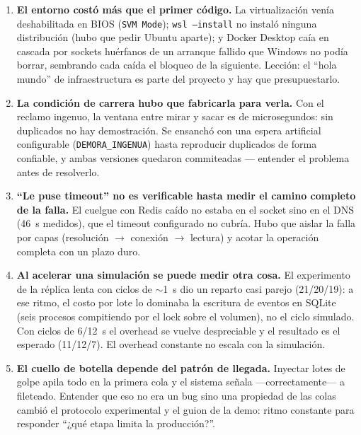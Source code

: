 \documentclass[12pt,a4paper]{article}
\begin{document}
\begin{enumerate}[leftmargin=*]
  \item \textbf{El entorno costó más que el primer código.} La virtualización
        venía deshabilitada en BIOS (\texttt{SVM Mode}); \texttt{wsl --install}
        no instaló ninguna distribución (hubo que pedir Ubuntu aparte); y
        Docker Desktop caía en cascada por sockets huérfanos de un arranque
        fallido que Windows no podía borrar, sembrando cada caída el bloqueo
        de la siguiente. Lección: el ``hola mundo'' de infraestructura es
        parte del proyecto y hay que presupuestarlo.
  \item \textbf{La condición de carrera hubo que fabricarla para verla.} Con
        el reclamo ingenuo, la ventana entre mirar y sacar es de
        microsegundos: sin duplicados no hay demostración. Se ensanchó con una
        espera artificial configurable (\texttt{DEMORA\_INGENUA}) hasta
        reproducir duplicados de forma confiable, y ambas versiones quedaron
        commiteadas — entender el problema antes de resolverlo.
  \item \textbf{``Le puse timeout'' no es verificable hasta medir el camino
        completo de la falla.} El cuelgue con Redis caído no estaba en el
        socket sino en el DNS (46~s medidos), que el timeout configurado no
        cubría. Hubo que aislar la falla por capas (resolución $\to$ conexión
        $\to$ lectura) y acotar la operación completa con un plazo duro.
  \item \textbf{Al acelerar una simulación se puede medir otra cosa.} El
        experimento de la réplica lenta con ciclos de $\sim$1~s dio un reparto
        casi parejo (21/20/19): a ese ritmo, el costo por lote lo dominaba la
        escritura de eventos en SQLite (seis procesos compitiendo por el lock
        sobre el volumen), no el ciclo simulado. Con ciclos de 6/12~s el
        overhead se vuelve despreciable y el resultado es el esperado
        (11/12/7). El overhead constante no escala con la simulación.
  \item \textbf{El cuello de botella depende del patrón de llegada.} Inyectar
        lotes de golpe apila todo en la primera cola y el sistema señala
        —correctamente— a fileteado. Entender que eso no era un bug sino una
        propiedad de las colas cambió el protocolo experimental y el guion de
        la demo: ritmo constante para responder ``¿qué etapa limita la
        producción?''.
\end{enumerate}
\end{document}

